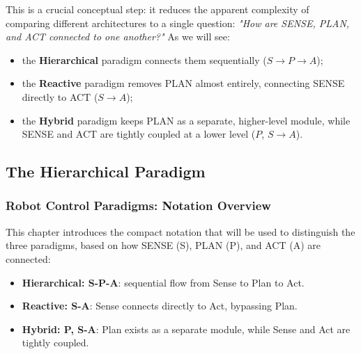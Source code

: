 This is a crucial conceptual step: it reduces the apparent complexity of comparing different architectures to a single question: \textit{"How are SENSE, PLAN, and ACT connected to one another?"} As we will see:
\begin{itemize}
    \item the \textbf{Hierarchical} paradigm connects them sequentially ($S \rightarrow P \rightarrow A$);
    \item the \textbf{Reactive} paradigm removes PLAN almost entirely, connecting SENSE directly to ACT ($S \rightarrow A$);
    \item the \textbf{Hybrid} paradigm keeps PLAN as a separate, higher-level module, while SENSE and ACT are tightly coupled at a lower level ($P$, $S \rightarrow A$).
\end{itemize}







\subsection{The Hierarchical Paradigm}

\subsubsection{Robot Control Paradigms: Notation Overview}

This chapter introduces the compact notation that will be used to distinguish the three paradigms, based on how SENSE (S), PLAN (P), and ACT (A) are connected:

\begin{itemize}
    \item \textbf{Hierarchical: S-P-A}: sequential flow from Sense to Plan to Act.
    \item \textbf{Reactive: S-A}: Sense connects directly to Act, bypassing Plan.
    \item \textbf{Hybrid: P, S-A}: Plan exists as a separate module, while Sense and Act are tightly coupled.
\end{itemize}

\begin{center}
\end{center}

